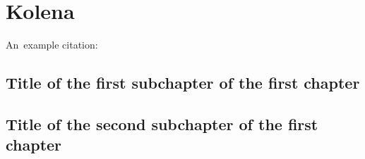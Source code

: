 \chapter{Kolena}

An~example citation: \cite{Andel07}

\section{Title of the first subchapter of the first chapter}

\section{Title of the second subchapter of the first chapter}
